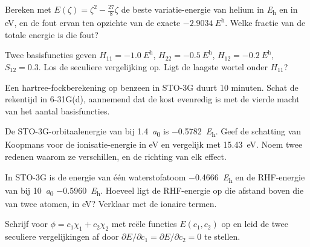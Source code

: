 \begin{exercise}[$\star\star$]\label{exo:b3:computational-chemistry:5}
Bereken met $E(\zeta) = \zeta^2 - \frac{27}{8}\zeta$ de beste
variatie-energie van helium in \unit{\hartree} en in eV, en de fout ervan
ten opzichte van de exacte
$\qty{-2.9034}{\hartree}$. Welke fractie van de totale energie is die fout?
\end{exercise}

\begin{exercise}[$\star\star$]\label{exo:b3:computational-chemistry:6}
Twee basisfuncties geven $H_{11} = \qty{-1.0}{\hartree}$, $H_{22} =
\qty{-0.5}{\hartree}$, $H_{12} = \qty{-0.2}{\hartree}$, $S_{12} = 0.3$. Los de
seculiere vergelijking op. Ligt de laagste wortel onder $H_{11}$?
\end{exercise}

\begin{exercise}[$\star\star$]\label{exo:b3:computational-chemistry:7}
Een hartree-fockberekening op benzeen in STO-3G duurt 10 minuten. Schat de
rekentijd in 6-31G(d), aannemend dat de kost evenredig is met de vierde
macht van het aantal basisfuncties.
\end{exercise}

\begin{exercise}[$\star\star$]\label{exo:b3:computational-chemistry:8}
De STO-3G-orbitaalenergie van  bij \qty{1.4}{\bohr} is
\qty{-0.5782}{\hartree}. Geef de schatting van Koopmans voor de
ionisatie-energie in eV en vergelijk met \qty{15.43}{eV}. Noem twee
redenen waarom ze verschillen, en de richting van elk effect.
\end{exercise}

\begin{exercise}[$\star\star$]\label{exo:b3:computational-chemistry:9}
In STO-3G is de energie van één waterstofatoom \qty{-0.4666}{\hartree} en de
RHF-energie van  bij \qty{10}{\bohr} \qty{-0.5960}{\hartree}. Hoeveel
ligt de RHF-energie op die afstand boven die van twee atomen, in eV?
Verklaar met de ionaire termen.
\end{exercise}

\begin{exercise}[$\star\star\star$]\label{exo:b3:computational-chemistry:10}
Schrijf voor $\phi = c_1\chi_1 + c_2\chi_2$ met reële functies $E(c_1,c_2)$ op
en leid de twee seculiere vergelijkingen af door $\partial E/\partial c_1 =
\partial E/\partial c_2 = 0$ te stellen.
\end{exercise}

